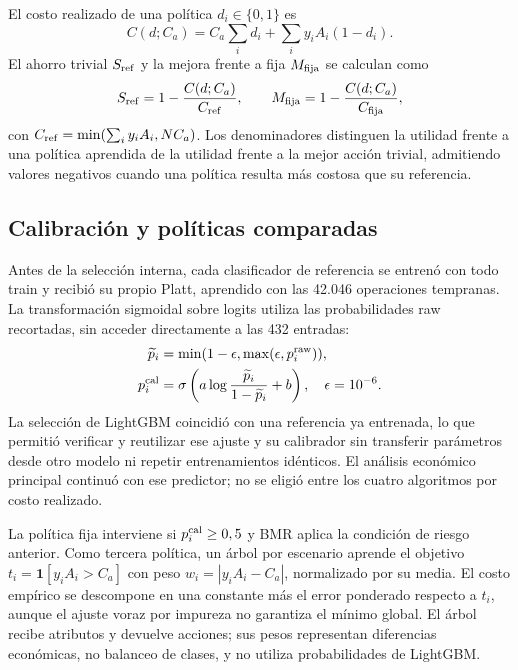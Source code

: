 \documentclass[conference,letterpaper]{IEEEtran}
\newcommand{\Ca}{C_a}
\newcommand{\ind}{\mathbf{1}}
\begin{document}
El costo realizado de una política $d_i\in\{0,1\}$ es
\begin{equation}
C(d;\Ca)=\Ca\sum_i d_i+\sum_i y_iA_i(1-d_i).
\end{equation}
El ahorro trivial $S_{\rm ref}$ y la mejora frente a fija $M_{\rm fija}$ se calculan como
\begin{equation}
S_{\rm ref}=1-\frac{C(d;\Ca)}{C_{\rm ref}},\qquad M_{\rm fija}=1-\frac{C(d;\Ca)}{C_{\rm fija}},
\end{equation}
con $C_{\rm ref}=\min(\sum_i y_iA_i,N\Ca)$. Los denominadores distinguen la utilidad frente a una política aprendida de la utilidad frente a la mejor acción trivial, admitiendo valores negativos cuando una política resulta más costosa que su referencia.

\subsection{Calibración y políticas comparadas}
Antes de la selección interna, cada clasificador de referencia se entrenó con todo train y recibió su propio Platt, aprendido con las 42.046 operaciones tempranas. La transformación sigmoidal sobre logits \cite{niculescu} utiliza las probabilidades raw recortadas, sin acceder directamente a las 432 entradas:
\begin{equation}
\begin{aligned}
\widetilde p_i&=\min(1-\epsilon,\max(\epsilon,p_i^{\rm raw})),\\
p_i^{\rm cal}&=\sigma\left(a\log\frac{\widetilde p_i}{1-\widetilde p_i}+b\right),\quad\epsilon=10^{-6}.
\end{aligned}
\end{equation}
La selección de LightGBM coincidió con una referencia ya entrenada, lo que permitió verificar y reutilizar ese ajuste y su calibrador sin transferir parámetros desde otro modelo ni repetir entrenamientos idénticos. El análisis económico principal continuó con ese predictor; no se eligió entre los cuatro algoritmos por costo realizado.

La política fija interviene si $p_i^{\rm cal}\geq0,5$ y BMR aplica la condición de riesgo anterior. Como tercera política, un árbol por escenario aprende el objetivo $t_i=\ind[y_iA_i>\Ca]$ con peso $w_i=|y_iA_i-\Ca|$, normalizado por su media. El costo empírico se descompone en una constante más el error ponderado respecto a $t_i$, aunque el ajuste voraz por impureza no garantiza el mínimo global. El árbol recibe atributos y devuelve acciones; sus pesos representan diferencias económicas, no balanceo de clases, y no utiliza probabilidades de LightGBM.
\end{document}
